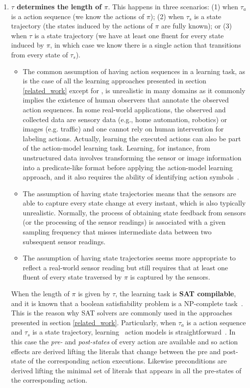 \begin{enumerate}
\item \textcolor[rgb]{1.00,0.00,0.00}{\textbf{$\tau$ determines the length of $\pi$}. This happens in three scenarios: (1) when $\tau_a$ is a \FO action sequence (we know the actions of $\pi$); (2) when $\tau_s$ is a \FO state trajectory (the states induced by the actions of $\pi$ are fully known); or (3) when $\tau$ is a \POstar state trajectory (we have at least one fluent for every state induced by $\pi$, in which case we know there is a single action that transitions from every state of $\tau_s$).}

    \begin{itemize}
    \item The common assumption of having \FO action sequences in a learning task, as is the case of all the learning approaches presented in section \ref{related_work} except for \FAMA, is unrealistic in many domains as it commonly implies the existence of human observers that annotate the observed action sequences. In some real-world applications, the observed and collected data are sensory data (e.g., home automation, robotics) or images (e.g. traffic) and one cannot rely on human intervention for labeling actions. Actually, learning the executed actions can also be part of the action-model learning task. Learning, for instance, from unstructured data involves transforming the sensor or image information into a predicate-like format before applying the action-model learning approach, and it also requires the ability of identifying action symbols~\cite{AsaiF18}.
    \item The assumption of having \FO state trajectories means that the sensors are able to capture every state change at every instant, which is also typically unrealistic. Normally, the process of obtaining state feedback from sensors (or the processing of the sensor readings) is associated with a given sampling frequency that misses intermediate data between two subsequent sensor readings.
    \item \textcolor[rgb]{1.00,0.00,0.00}{The assumption of having \POstar state trajectories seems more appropriate to reflect a real-world sensor reading but still requires that at least one fluent of every state traversed by $\pi$ is captured by the sensors.}
    \end{itemize}

When the length of $\pi$ is given by $\tau$, the learning task is \textbf{SAT compilable}, and it is known that a boolean satisfiability problem is a NP-complete task~\cite{cook1971complexity}. This is the reason why SAT solvers are commonly used in the approaches presented in section \ref{related_work}. Particularly, when $\tau_a$ is a \FO action sequence and $\tau_s$ is a \FO state trajectory, learning \strips\ action models is straightforward~\cite{jimenez2012review}. In this case the {\em pre-} and {\em post-states} of every action are available and so action effects are derived lifting the literals that change between the pre and post-state of the corresponding action executions. Likewise preconditions are derived lifting the minimal set of literals that appears in all the pre-states of the corresponding action.



\end{enumerate}
